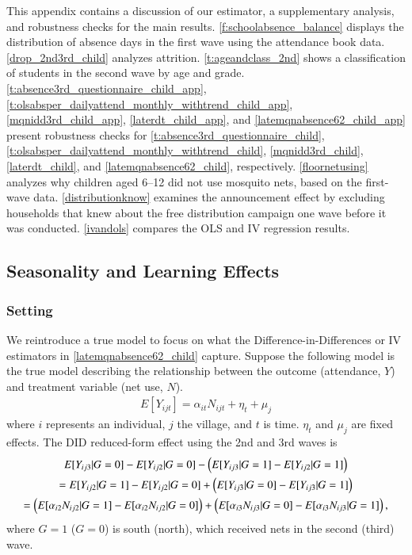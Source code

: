 \documentclass[fleqn,11pt]{article}
\begin{document}
This appendix contains a discussion of our estimator, a supplementary analysis, and robustness checks for the main results. \autoref{f:schoolabsence_balance} displays the distribution of absence days in the first wave using the attendance book data. \autoref{drop_2nd3rd_child} analyzes attrition. \autoref{t:ageandclass_2nd} shows a classification of students in the second wave by age and grade. \autoref{t:absence3rd_questionnaire_child_app}, \autoref{t:olsabsper_dailyattend_monthly_withtrend_child_app}, \autoref{mqnidd3rd_child_app}, \autoref{laterdt_child_app}, and \autoref{latemqnabsence62_child_app} present robustness checks for \autoref{t:absence3rd_questionnaire_child}, \autoref{t:olsabsper_dailyattend_monthly_withtrend_child}, \autoref{mqnidd3rd_child}, \autoref{laterdt_child}, and \autoref{latemqnabsence62_child}, respectively.  \autoref{floornetusing} analyzes why children aged 6--12 did not use mosquito nets, based on the first-wave data. \autoref{distributionknow} examines the announcement effect by excluding households that knew about the free distribution campaign one wave before it was conducted. \autoref{ivandols} compares the OLS and IV regression results. 

\subsection{Seasonality and Learning Effects}
\subsubsection{Setting}
We reintroduce a true model to focus on what the Difference-in-Differences or IV estimators in \autoref{latemqnabsence62_child} capture. Suppose the following model is the true model describing the relationship between the outcome (attendance, $Y$) and treatment variable (net use, $N$).
\begin{gather*}
E[Y_{ijt}] = \alpha_{it} N_{ijt} + \eta_{t} + \mu_{j} 
\end{gather*}
where $i$ represents an individual, $j$ the village, and $t$ is time. $\eta_{t} $ and $\mu_{j}$ are fixed effects.
The DID reduced-form effect using the 2nd and 3rd waves is
\begin{gather}
E[Y_{ij3}|G=0] - E[Y_{ij2}|G=0]  - \left(E[Y_{ij3}|G=1] - E[Y_{ij2}|G=1] \right) \notag \\
=E[Y_{ij2}|G=1] - E[Y_{ij2}|G=0]  + \left(E[Y_{ij3}|G=0] - E[Y_{ij3}|G=1] \right)\notag \\
 =  \left( E[\alpha_{i2} N_{ij2}|G=1]   - E[\alpha_{i2}N_{ij2}|G=0]\right) +  \left(  E[\alpha_{i3}N_{ij3}|G=0] - E[\alpha_{i3} N_{ij3}|G=1]  \right),
\end{gather}
where $G=1$ ($G=0$) is south (north), which received nets in the second (third) wave. 
\end{document}

